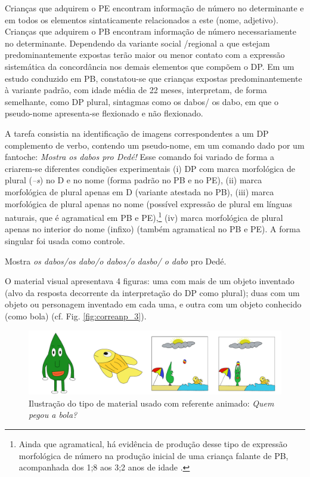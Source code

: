 \documentclass[output=paper]{LSP/langsci}
\begin{document}
Crianças que adquirem o PE encontram informação de número no determinante e em todos os elementos sintaticamente relacionados a este (nome, adjetivo). Crianças que adquirem o PB encontram informação de número necessariamente no determinante. Dependendo da variante social /regional a que estejam predominantemente expostas terão maior ou menor contato com a expressão sistemática da concordância nos demais elementos que compõem o DP. Em um estudo conduzido em PB, constatou-se que crianças expostas predominantemente à variante padrão, com idade média de 22 meses, interpretam, de forma semelhante, como DP plural, sintagmas como os dabos/ os dabo, em que o pseudo-nome apresenta-se flexionado e não flexionado.

A tarefa consistia na identificação de imagens correspondentes a um DP complemento de verbo, contendo um pseudo-nome, em um comando dado por um fantoche: \textit{Mostra os dabos pro Dedé!}  Esse comando foi variado de forma a criarem-se diferentes condições experimentais (i) DP com marca morfológica de plural (\textit{–s}) no D e no nome (forma padrão no PB e no PE), (ii) marca morfológica de plural apenas em D (variante atestada no PB), (iii) marca morfológica de plural apenas no nome (possível expressão de plural em línguas naturais, que é agramatical em PB e PE),\footnote{Ainda que agramatical, há evidência de produção desse tipo de expressão morfológica de número na produção inicial de uma criança falante de PB, acompanhada dos 1;8 aos 3;2 anos de idade \citep{lopes2004,simioni2006}.} (iv) marca morfológica de plural apenas no interior do nome (infixo) (também agramatical no PB e PE). A forma singular foi usada como controle.

\ea\label{ex:correanp_19} Mostra \textit{os dabos/os dabo/o dabos/o dasbo/ o dabo} pro Dedé.
\z

\newpage O material visual apresentava 4 figuras: uma com mais de um objeto inventado (alvo da resposta decorrente da interpretação do DP como plural); duas com um objeto ou personagem inventado em cada uma, e outra com um objeto conhecido (como bola) (cf. Fig. \ref{fig:correanp_3}).

\begin{figure}
\includegraphics[width=\textwidth]{figures/correanp2.pdf}
\caption{Ilustração do tipo de material usado com referente animado: \textit{Quem pegou a bola?}}
\label{fig:correanp_2}
\end{figure}
\end{document}
